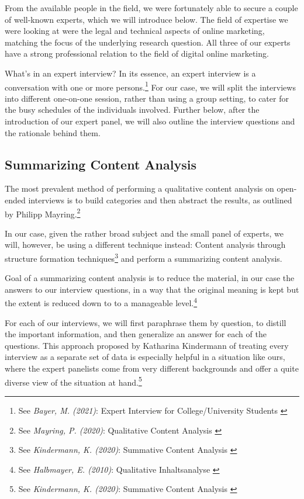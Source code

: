 From the available people in the field, we were fortunately able to secure a couple of well-known experts, which we will introduce below. The field of expertise we were looking at were the legal and technical aspects of online marketing, matching the focus of the underlying research question. All three of our experts have a strong professional relation to the field of digital online marketing.

What's in an expert interview? In its essence, an expert interview is a conversation with one or more persons.\footnote{See \textit{Bayer, M. (2021)}: Expert Interview for College/University Students \cite{whatIsInterview}} For our case, we will split the interviews into different one-on-one session, rather than using a group setting, to cater for the busy schedules of the individuals involved. Further below, after the introduction of our expert panel, we will also outline the interview questions and the rationale behind them.

\subsection{Summarizing Content Analysis} 

The most prevalent method of performing a qualitative content analysis on open-ended interviews is to build categories and then abstract the results, as outlined by Philipp Mayring.\footnote{See \textit{Mayring, P. (2020)}: Qualitative Content Analysis \cite{qualiContent}}

In our case, given the rather broad subject and the small panel of experts, we will, however, be using a different technique instead: Content analysis through structure formation techniques\footnote{See \textit{Kindermann, K. (2020)}: Summative Content Analysis \cite{summaContent}} and perform a summarizing content analysis.

Goal of a summarizing content analysis is to reduce the material, in our case the answers to our interview questions, in a way that the original meaning is kept but the extent is reduced down to to a manageable level.\footnote{See \textit{Halbmayer, E. (2010)}: Qualitative Inhaltsanalyse \cite{summaryVienna}}

For each of our interviews, we will first paraphrase them by question, to distill the important information, and then generalize an answer for each of the questions. This approach proposed by Katharina Kindermann of treating every interview as a separate set of data is especially helpful in a situation like ours, where the expert panelists come from very different backgrounds and offer a quite diverse view of the situation at hand.\footnote{See \textit{Kindermann, K. (2020)}: Summative Content Analysis \cite{summaContent}}

